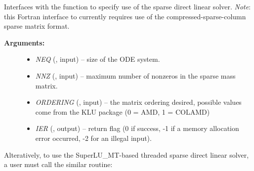 \documentclass[letterpaper,10pt,english]{sphinxmanual}
\begin{document}
\begin{fulllineitems}
\label{f_interface/Usage:f/_/FARKMASSKLU}
Interfaces with the {\hyperref[c_interface/User_callable:c.ARKMassKLU]{\emph{}}} function to
specify use of the sparse direct linear solver.  \emph{Note}: this
Fortran interface to {\hyperref[c_interface/User_callable:c.ARKMassKLU]{\emph{}}} currently requires use
of the compressed-sparse-column sparse matrix format.
\begin{description}
\item[{\textbf{Arguments:}}] \leavevmode\begin{itemize}
\item {} 
\emph{NEQ} (, input) -- size of the ODE system.

\item {} 
\emph{NNZ} (, input) -- maximum number of nonzeros in
the sparse mass matrix.

\item {} 
\emph{ORDERING} (, input) -- the matrix ordering desired,
possible values come from the KLU package (0 = AMD, 1 = COLAMD)

\item {} 
\emph{IER} (, output) -- return flag (0 if success, -1 if a
memory allocation error occurred, -2 for an illegal input).

\end{itemize}

\end{description}

\end{fulllineitems}


Alteratively, to use the SuperLU\_MT-based threaded sparse direct
linear solver, a user must call the similar {\hyperref[f_interface/Usage:f/_/FARKMASSSUPERLUMT]{\emph{}}}
routine:
\end{document}
